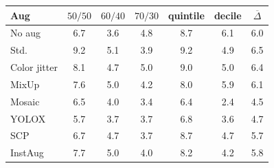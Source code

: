 \begin{tabular}{l ccccc c}
\toprule
Aug & $50/50$ & $60/40$ & $70/30$ & \textbf{quintile} & decile & $\overline{\Delta}$ \\
\midrule
No aug & 6.7 & 3.6 & 4.8 & 8.7 & 6.1 & 6.0 \\
Std. & 9.2 & 5.1 & 3.9 & 9.2 & 4.9 & 6.5 \\
Color jitter & 8.1 & 4.7 & 5.0 & 9.0 & 5.0 & 6.4 \\
MixUp & 7.6 & 5.0 & 4.2 & 8.0 & 5.9 & 6.1 \\
Mosaic & 6.5 & 4.0 & 3.4 & 6.4 & 2.4 & 4.5 \\
YOLOX & 5.7 & 3.7 & 3.7 & 6.8 & 3.6 & 4.7 \\
SCP & 6.7 & 4.7 & 3.7 & 8.7 & 4.7 & 5.7 \\
InstAug & 7.7 & 5.0 & 4.0 & 8.2 & 4.2 & 5.8 \\
\bottomrule
\end{tabular}
